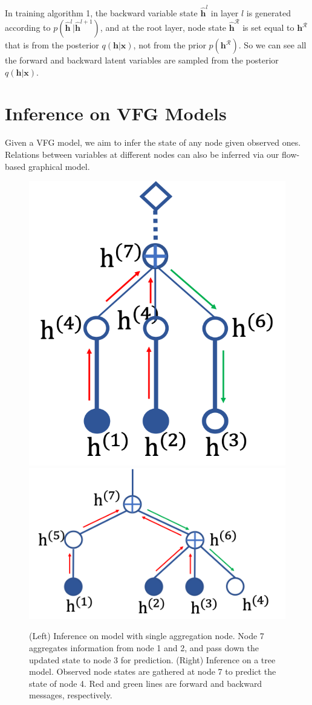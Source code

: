 \documentclass[sigconf, anonymous, review]{acmart}
\theoremstyle{plain}
\theoremstyle{definition}
\theoremstyle{remark}
\begin{document}
In training algorithm 1, the backward variable state $\widehat{\mathbf{h}}^l$ in  layer $l$  is generated according to $p(\widehat{\mathbf{h}}^l | \widehat{\mathbf{h}}^{l+1})$, and at the root  layer,  node state $\widehat{\mathbf{h}}^{\mathcal{R}}$ is set  equal to  $\mathbf{h}^{\mathcal{R}}$ that is
from  the posterior $q(\mathbf{h}|\mathbf{x})$, not from the prior $p(\mathbf{h}^{\mathcal{R}})$. So we can see all the forward and backward latent variables are sampled from the posterior $q(\mathbf{h}|\mathbf{x})$. 


\vspace{-0.1in}
\section{Inference on VFG Models }\label{sec:infer}
Given a  VFG model, we aim to infer the state of any node given observed ones. 
Relations between variables at different nodes can also be inferred via our flow-based graphical model. \begin{figure}[h]
\begin{center}
 \includegraphics[width=0.3\linewidth]{fig/two_layer_infer.png}
 \includegraphics[width=0.57\linewidth]{fig/tree_infer.png}
\end{center}
\vspace{-0.1in}
 \caption{{\small (Left) Inference on model with single aggregation node. Node 7 aggregates information from node 1 and 2, and  pass down the updated state to node 3 for prediction. (Right) Inference on a tree model. Observed node states are gathered at node 7 to predict the state of node 4. Red and green lines are forward and backward messages, respectively.}}
\label{fig:two_layer_infer}
\vspace{-0.1in}
\end{figure}
\end{document}
